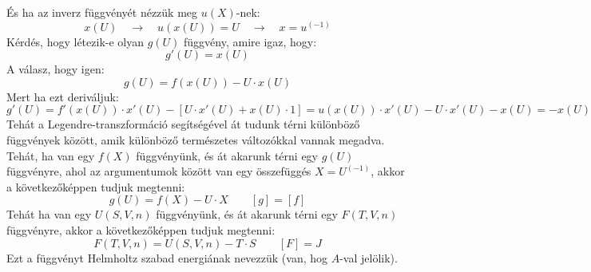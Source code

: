 \documentclass[../main.tex]{subfiles}
\begin{document}
És ha az inverz függvényét nézzük meg $u(X)$-nek:
\begin{equation}
    x(U) \quad \rightarrow \quad u(x(U)) = U \quad \rightarrow \quad x = u^{(-1)}
\end{equation}
Kérdés, hogy létezik-e olyan $g(U)$ függvény, amire igaz, hogy:
\begin{equation}
    g'(U) = x(U)
\end{equation}
A válasz, hogy igen:
\begin{equation}
    g(U) = f(x(U)) - U \cdot x(U)
\end{equation}
Mert ha ezt deriváljuk:
\begin{equation}
    g'(U) = f'(x(U)) \cdot x'(U) - \left[ U \cdot x'(U) + x(U) \cdot 1 \right] = u(x(U)) \cdot x'(U) - U \cdot x'(U) - x(U) = - x(U)
\end{equation}
Tehát a Legendre-transzformáció segítségével át tudunk térni különböző függvények között, amik különböző természetes változókkal vannak megadva.
Tehát, ha van egy $f(X)$ függvényünk, és át akarunk térni egy $g(U)$ függvényre, ahol az argumentumok között van egy összefüggés $X = U^{(-1)}$, akkor a következőképpen tudjuk megtenni:
\begin{equation}
    g(U) = f(X) - U \cdot X \qquad \left[g\right] = \left[f\right]
\end{equation}
Tehát ha van egy $U(S,V,n)$ függvényünk, és át akarunk térni egy $F(T,V,n)$ függvényre, akkor a következőképpen tudjuk megtenni:
\begin{equation}
    F(T,V,n) = U(S,V,n) - T \cdot S \qquad \left[F\right] = J
\end{equation}
Ezt a függvényt Helmholtz szabad energiának nevezzük (van, hog $A$-val jelölik).
\end{document}
